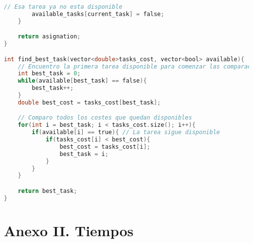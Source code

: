 \documentclass[10pt, a4paper]{article}
\theoremstyle{theorem-style}
\theoremstyle{theorem-style}
\theoremstyle{definition-style}
\theoremstyle{remark-style}
\theoremstyle{example-style}
\theoremstyle{definition-style}
\theoremstyle{remark-style}
\begin{document}
\begin{lstlisting}[language=C]
        // Esa tarea ya no esta disponible
        available_tasks[current_task] = false;
    }

    return asignation;
}

int find_best_task(vector<double>tasks_cost, vector<bool> available){
    // Encuentro la primera tarea disponible para comenzar las comparaciones
    int best_task = 0;
    while(available[best_task] == false){
        best_task++;
    }
    double best_cost = tasks_cost[best_task];

    // Comparo todos los costes que quedan disponibles
    for(int i = best_task; i < tasks_cost.size(); i++){
        if(available[i] == true){ // La tarea sigue disponible
            if(tasks_cost[i] < best_cost){
                best_cost = tasks_cost[i];
                best_task = i;
            }
        }
    }

    return best_task;
}
\end{lstlisting}
\pagebreak

\section*{Anexo II. Tiempos}

\begin{center}
\end{center}
\end{document}
